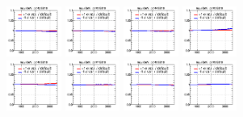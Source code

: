 \begin{figure}[!htbp]
{{\includegraphics[width=0.16\textwidth]{fig/spectra__pdf42_BB18_ADDGRW.png}
\includegraphics[width=0.16\textwidth]{fig/spectra__pdf43_BB18_ADDGRW.png}
\includegraphics[width=0.16\textwidth]{fig/spectra__pdf44_BB18_ADDGRW.png}
\includegraphics[width=0.16\textwidth]{fig/spectra__pdf45_BB18_ADDGRW.png}\\
\includegraphics[width=0.16\textwidth]{fig/spectra__pdf46_BB18_ADDGRW.png}
\includegraphics[width=0.16\textwidth]{fig/spectra__pdf47_BB18_ADDGRW.png}
\includegraphics[width=0.16\textwidth]{fig/spectra__pdf48_BB18_ADDGRW.png}
\includegraphics[width=0.16\textwidth]{fig/spectra__pdf49_BB18_ADDGRW.png}
}}
\end{figure}
